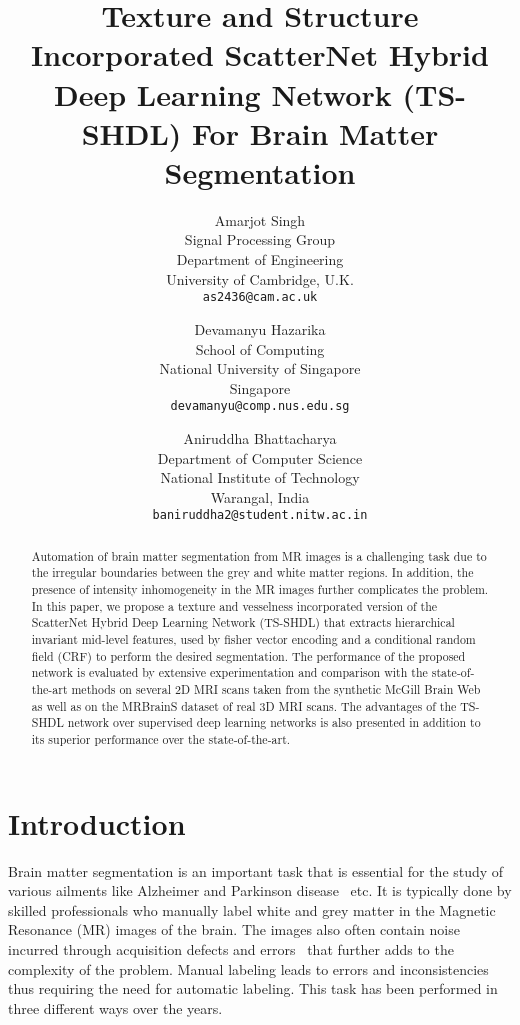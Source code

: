 \documentclass[10pt,twocolumn,letterpaper]{article}
\title{Texture and Structure Incorporated ScatterNet Hybrid Deep Learning Network (TS-SHDL) For Brain Matter Segmentation}
\begin{document}
\author{Amarjot Singh\\
Signal Processing Group \\ 
Department of Engineering \\
University of Cambridge, U.K.\\
{\tt\small as2436@cam.ac.uk}
\and
Devamanyu Hazarika\\
School of Computing \\
National University of Singapore \\
Singapore \\
{\tt\small devamanyu@comp.nus.edu.sg}
\and
Aniruddha Bhattacharya\\
Department of Computer Science \\
National Institute of Technology \\
Warangal, India \\
{\tt\small baniruddha2@student.nitw.ac.in}}

\maketitle


\begin{abstract}
Automation of brain matter segmentation from MR images is a challenging task due to the irregular boundaries between the grey and white matter regions. In addition, the presence of intensity inhomogeneity in the MR images further complicates the problem. In this paper, we propose a texture and vesselness incorporated version of the ScatterNet Hybrid Deep Learning Network (TS-SHDL) that extracts hierarchical invariant mid-level features, used by fisher vector encoding and a conditional random field (CRF) to perform the desired segmentation. The performance of the proposed network is evaluated by extensive experimentation and comparison with the state-of-the-art methods on several 2D MRI scans taken from the synthetic McGill Brain Web as well as on the MRBrainS dataset of real 3D MRI scans. The advantages of the TS-SHDL network over supervised deep learning networks is also presented in addition to its superior performance over the state-of-the-art.
\end{abstract}

\section{Introduction}
Brain matter segmentation is an important task that is essential for the study of various ailments like Alzheimer and Parkinson disease~\cite{lowe2004distinctive} etc. It is typically done by skilled professionals who manually label white and grey matter in the Magnetic Resonance (MR) images of the brain. The images also often contain noise incurred through acquisition defects and errors~\cite{vovk2007review} that further adds to the complexity of the problem. Manual labeling leads to errors and inconsistencies thus requiring the need for automatic labeling. This task has been performed in three different ways over the years.
\end{document}
